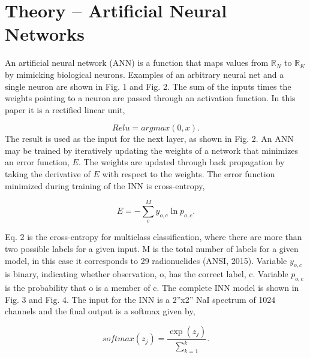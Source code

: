 \documentclass[11pt]{article}
\begin{document}
\section{Theory -- Artificial Neural Networks}

An artificial neural network (ANN) is a function that maps values from ${\mathbb{R}}_{N}$ to ${\mathbb{R}}_{K}$ by mimicking biological 
neurons. Examples of an arbitrary neural net and a single neuron are shown in Fig. 1 and Fig. 2. The 
sum of the inputs times the weights pointing to a neuron are passed through an activation function.
In this paper it is a rectified linear unit,

\begin{equation}
Relu = argmax(0, x).
\end{equation}
The result is used as the input for the next layer, as shown in Fig. 2. 
An ANN may be trained by iteratively updating the weights of a network that minimizes an error function, $E$. 
The weights are updated through back propagation by taking the derivative of $E$ with respect to the weights. 
The error function minimized during training of the INN is cross-entropy,

\begin{equation}
E = -\sum_{c}^{M}y_{o,c}\ln{p_{o,c}}.
\end{equation}


Eq. 2 is the cross-entropy for multiclass classification, where there are more than two possible labels 
for a given input. M is the total number of labels for a given model, in this case it corresponds to 29 
radionuclides (ANSI, 2015). Variable $y_{o,c}$ is binary, indicating whether observation, o, has the correct label, c. 
Variable $p_{o,c}$ is the probability that o is a member of c. The complete INN model is shown in Fig. 3 and Fig. 4. 
The input for the INN is a 2”x2” NaI spectrum of 1024 channels and the final output is a softmax given by,

\begin{equation}
softmax(z_j) = \frac{\exp(z_j)}{\sum_{k=1}^{k}}.
\end{equation}
\end{document}

